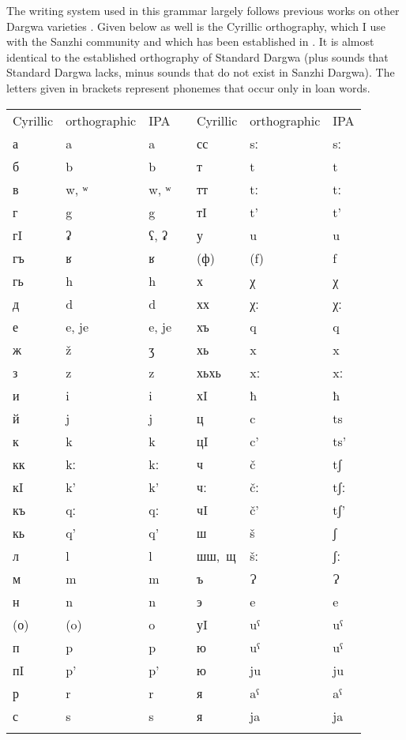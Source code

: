 \label{Orthographic conventions}

The writing system used in this grammar largely follows previous works on other Darg\-wa varieties \citep{Sumbatova.Mutalov2003, Sumbatova.Lander2014}. Given below as well is the Cyrillic {orthography}, which I use with the Sanzhi community and which has been established in \citet{Forker.Gadzhimuradov2017}. It is almost identical to the established {orthography} of Standard Dargwa (plus sounds that Standard Dargwa lacks, minus sounds that do not exist in Sanzhi Dargwa). The letters given in brackets represent phonemes that occur only in loan words.
%
\largerpage[2]
\begin{table}[h!]
	\centering
	\small
	\begin{tabularx}{0.8\textwidth}[]{lllXlll}
	\lsptoprule
			Cyrillic &	orthographic &	IPA	&	{}	&	Cyrillic &	orthographic &	IPA\\
		\cmidrule{1-3} \cmidrule{5-7}
			а	&	a	&	a	&	{}	&	сс	&	sː	&	sː\\
			б	&	b	&	b	&	{}	&	т	&	t	&	t\\
			в	&	w, ʷ	&	w, ʷ	&	{}	&	тт	&	tː	&	tː\\
			г	&	g 	&	g	&	{}	&	тI	&	t’	&	t’\\
			гI	&	ʡ	&	ʕ, ʡ	&	{}	&	у	&	u	&	u\\
			гъ	&	ʁ	&	ʁ	&	{}	&	(ф)	&	(f)	&	f\\
			гь	&	h	&	h	&	{}	&	х	&	χ	&	χ\\
			д	&	d	&	d	&	{}	&	хх	&	χː	&	χː\\
			е	&	e, je	&	e, je	&	{}	&	хъ	&	q	&	q\\	
			ж	&	ž	&	ʒ	&	{}	&	хь	&	x	&	x\\   
			з	&	z	&	z	&	{}	&	хьхь	&	xː	&	xː\\
			и	&	i	&	i	&	{}	&	хI	&	ħ	&	ħ\\
			й	&	j	&	j	&	{}	&	ц	&	c	&	ts\\
			к	&	k	&	k	&	{}	&	цI	&	c’	&	ts’\\
			кк	&	kː	&	kː	&	{}	&	ч	&	č	&	tʃ\\
			кI	&	k’	&	k’	&	{}	&	чː	&	čː	&	tʃː\\
			къ	&	qː	&	qː	&	{}	&	чI	&	č’	&	tʃ’\\
			кь	&	q’	&	q’	&	{}	&	ш	&	š	&	ʃ\\
			л	&	l	&	l	&	{}	&	\mbox{шш, щ}& šː	&	ʃː\\
			м	&	m	&	m	&	{}	&	ъ	&	Ɂ	&	Ɂ\\
			н	&	n	&	n	&	{}	&	э	&	e	&	e\\
			(о)	&	(o)	&	o	&	{}	&	уI	&	uˁ	&	uˁ\\
			п	&	p	&	p	&	{}	&	ю	&	uˁ	&	uˁ\\
			пI	&	p’	&	p’	&	{}	&	ю	&	ju	&	ju\\
			р	&	r	&	r	&	{}	&	я	&	aˁ	&	aˁ\\
			с	&	s	&	s	&	{}	&	я	&	ja	&	ja\\
			\lspbottomrule
	\end{tabularx}
\end{table}


